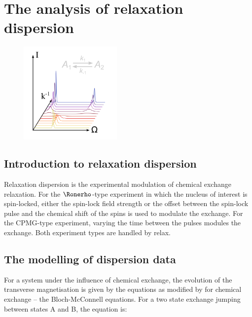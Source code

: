 
\chapter[Relaxation dispersion]{The analysis of relaxation dispersion} \label{ch: relax-disp}

\begin{figure}[h]
\includegraphics[width=5cm, bb=0 0 1701 1701]{graphics/analyses/relax_disp_600x600}
\end{figure}



\section{Introduction to relaxation dispersion}

Relaxation dispersion is the experimental modulation of chemical exchange relaxation.  For the $\Ronerho$-type experiment in which the nucleus of interest is spin-locked, either the spin-lock field strength or the offset between the spin-lock pulse and the chemical shift of the spins is used to modulate the exchange.  For the CPMG-type experiment, varying the time between the pulses modules the exchange.  Both experiment types are handled by relax.



\section{The modelling of dispersion data}

For a system under the influence of chemical exchange, the evolution of the transverse magnetisation is given by the \citet{Bloch46} equations as modified by \citet{McConnell58} for chemical exchange -- the Bloch-McConnell equations.
For a two state exchange jumping between states A and B, the equation is:

